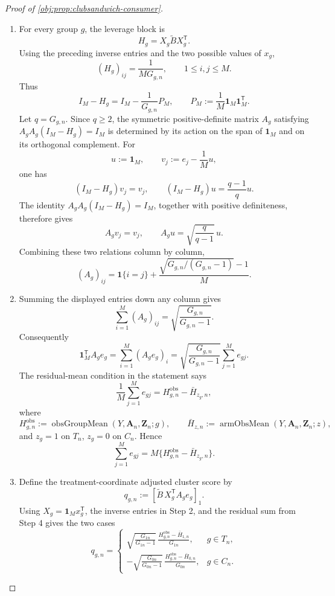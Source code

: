 \begin{proof}[Proof of \cref{obj:prop:clubsandwich-consumer}]
\begin{enumerate}
\item
For every group \(g\), the leverage block is
\[
H_g=X_g\widetilde B X_g^{\mathsf T}.
\]
Using the preceding inverse entries and the two possible values of \(x_g\),
\[
(H_g)_{ij}
=
\frac{1}{M G_{g,n}},
\qquad
1\le i,j\le M.
\]
Thus
\[
I_M-H_g
=
I_M-\frac{1}{G_{g,n}}P_M,
\qquad
P_M:=\frac{1}{M}\mathbf 1_M\mathbf 1_M^{\mathsf T}.
\]
Let \(q=G_{g,n}\).  Since \(q\ge2\), the symmetric positive-definite matrix
\(A_g\) satisfying \(A_gA_g(I_M-H_g)=I_M\) is determined by its action on the
span of \(\mathbf 1_M\) and on its orthogonal complement.  For
\[
u:=\mathbf 1_M,
\qquad
v_j:=e_j-\frac1M u,
\]
one has
\[
(I_M-H_g)v_j=v_j,
\qquad
(I_M-H_g)u=\frac{q-1}{q}u.
\]
The identity \(A_gA_g(I_M-H_g)=I_M\), together with positive definiteness,
therefore gives
\[
A_gv_j=v_j,
\qquad
A_gu=\sqrt{\frac{q}{q-1}}\,u.
\]
Combining these two relations column by column,
\[
(A_g)_{ij}
=
\mathbf 1\{i=j\}
+
\frac{\sqrt{G_{g,n}/(G_{g,n}-1)}-1}{M}.
\]

\item
Summing the displayed entries down any column gives
\[
\sum_{i=1}^{M}(A_g)_{ij}
=
\sqrt{\frac{G_{g,n}}{G_{g,n}-1}}.
\]
Consequently
\[
\mathbf 1_M^{\mathsf T}A_ge_g
=
\sum_{i=1}^{M}(A_ge_g)_i
=
\sqrt{\frac{G_{g,n}}{G_{g,n}-1}}
\sum_{j=1}^{M}e_{gj}.
\]
The residual-mean condition in the statement says
\[
\frac1M\sum_{j=1}^{M}e_{gj}
=
H_{g,n}^{\mathrm{obs}}-\bar H_{z_g,n},
\]
where
\[
H_{g,n}^{\mathrm{obs}}:=\operatorname{obsGroupMean}(Y,\mathbf A_n,\mathbf Z_n;g),
\qquad
\bar H_{z,n}:=\operatorname{armObsMean}(Y,\mathbf A_n,\mathbf Z_n;z),
\]
and \(z_g=1\) on \(T_n\), \(z_g=0\) on \(C_n\).  Hence
\[
\sum_{j=1}^{M}e_{gj}
=
M\{H_{g,n}^{\mathrm{obs}}-\bar H_{z_g,n}\}.
\]

\item
Define the treatment-coordinate adjusted cluster score by
\[
q_{g,n}
:=
\left[
\widetilde B\,X_g^{\mathsf T}A_ge_g
\right]_1 .
\]
Using \(X_g=\mathbf 1_Mx_g^{\mathsf T}\), the inverse entries in Step 2, and the
residual sum from Step 4 gives the two cases
\[
q_{g,n}
=
\begin{cases}
\displaystyle
\sqrt{\frac{G_{1n}}{G_{1n}-1}}\,
\frac{H_{g,n}^{\mathrm{obs}}-\bar H_{1,n}}{G_{1n}},
& g\in T_n,\\[1.2em]
\displaystyle
-\sqrt{\frac{G_{0n}}{G_{0n}-1}}\,
\frac{H_{g,n}^{\mathrm{obs}}-\bar H_{0,n}}{G_{0n}},
& g\in C_n.
\end{cases}
\]


\end{enumerate}
\end{proof}
